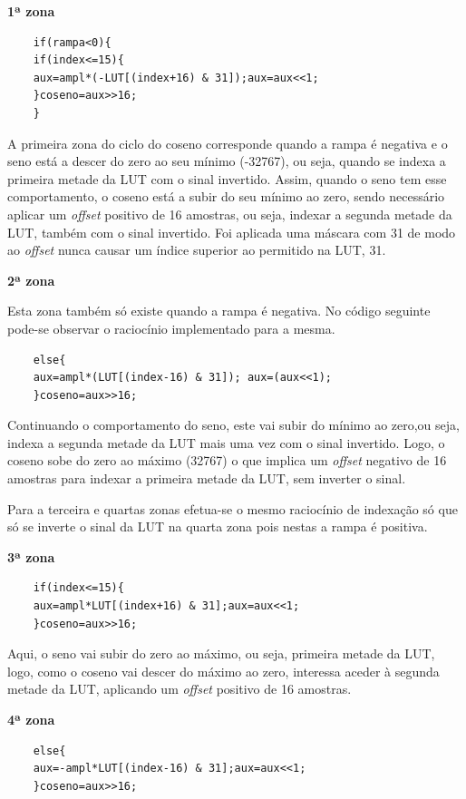 \documentclass[11pt]{article}
\numberwithin{equation}{section}
\begin{document}
	\textbf{1ª zona}
	\begin{lstlisting}
	if(rampa<0){
	if(index<=15){
	aux=ampl*(-LUT[(index+16) & 31]);aux=aux<<1;
	}coseno=aux>>16;
	}
	\end{lstlisting}
	
	A primeira zona do ciclo do coseno corresponde quando a rampa é negativa e o seno está a descer do zero ao seu mínimo (-32767), ou seja, quando se indexa a primeira metade da LUT com o sinal invertido. Assim, quando o seno tem esse comportamento, o coseno está a subir do seu mínimo ao zero, sendo necessário aplicar um \textit{offset} positivo de 16 amostras, ou seja, indexar a segunda metade da LUT, também com o sinal invertido. Foi aplicada uma máscara com 31 de modo ao \textit{offset} nunca causar um índice superior ao permitido na LUT, 31.
	\vspace{1mm}
	
	\textbf{2ª zona}
	
	Esta zona também só existe quando a rampa é negativa. No código seguinte pode-se observar o raciocínio implementado para a mesma.
	\begin{lstlisting}
	else{
	aux=ampl*(LUT[(index-16) & 31]); aux=(aux<<1);
	}coseno=aux>>16;
	\end{lstlisting}
	
	Continuando o comportamento do seno, este vai subir do mínimo ao zero,ou seja, indexa a segunda metade da LUT mais uma vez com o sinal invertido. Logo, o coseno sobe do zero ao máximo (32767) o que implica um \textit{offset} negativo de 16 amostras para indexar a primeira metade da LUT, sem inverter o sinal.
	
	Para a terceira e quartas zonas efetua-se o mesmo raciocínio de indexação só que só se inverte o sinal da LUT na quarta zona pois nestas a rampa é positiva.
	\vspace{1mm}
	
	\textbf{3ª zona}
	\begin{lstlisting}
	if(index<=15){
	aux=ampl*LUT[(index+16) & 31];aux=aux<<1;
	}coseno=aux>>16;
	\end{lstlisting}
	
	Aqui, o seno vai subir do zero ao máximo, ou seja, primeira metade da LUT, logo, como o coseno vai descer do máximo ao zero, interessa aceder à segunda metade da LUT, aplicando um \textit{offset} positivo de 16 amostras.
	\vspace{1mm}
	
	\textbf{4ª zona}
	\begin{lstlisting}
	else{
	aux=-ampl*LUT[(index-16) & 31];aux=aux<<1;
	}coseno=aux>>16;
	\end{lstlisting}
	
\end{document}
